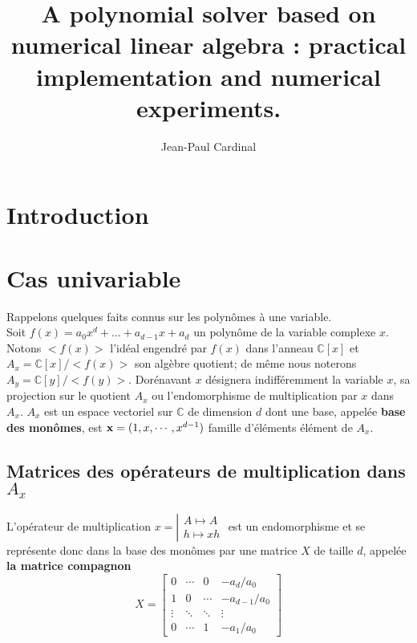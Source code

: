 \documentclass{article}
\theoremstyle{plain}%
\theoremstyle{definition}
\theoremstyle{remark}
\newcommand{\C}{\mathbb{C}}
\begin{document}

\title{A polynomial solver based on numerical linear algebra : practical implementation and numerical experiments.}
\author{Jean-Paul Cardinal}



\begin{abstract} 
\end{abstract}


\section{Introduction}


\section{Cas univariable}
\label{univariable}

Rappelons quelques faits connus sur les polynômes à une variable.\\
Soit $f(x) = a_0x^d + \dots + a_{d-1}x + a_d$ un polynôme de la variable complexe $x$. Notons $<f(x)>$ l'idéal engendré par $f(x)$ dans l'anneau $\C[x]$ et $A_x = \C[x]/<f(x)>$  son algèbre quotient; de même nous noterons $A_y = \C[y]/<f(y)>$. Dorénavant $x$ désignera indifféremment la variable $x$, sa projection sur le quotient $A_x$ ou l'endomorphisme de multiplication par $x$ dans $A_x$. $A_x$ est un espace vectoriel sur $\C$ de dimension $d$ dont une base, appelée {\bf base des monômes}, est $\bold{x} = (1, x,\cdots, x^{d-1})$ famille d'éléments élément de $A_x$. 

\subsection{Matrices des opérateurs de multiplication dans $A_x$}
L'opérateur de multiplication
$x = \left\vert
\begin{array}{c}
A \mapsto A \\
h \mapsto xh
\end{array} 
\right.$ est un endomorphisme et se représente donc dans la base des monômes par 
une matrice $X$ de taille $d$, appelée {\bf la matrice compagnon}
\begin{equation}
\label{compan}
X =
\begin{bmatrix}
	0 & \cdots & 0 & -a_d/a_0 \\
	1 & 0 & \cdots & -a_{d-1}/a_0 \\
	\vdots  & \ddots  & \ddots & \vdots  \\
	0 & \cdots & 1 & -a_1/a_0
\end{bmatrix}
\end{equation}
\end{document}
